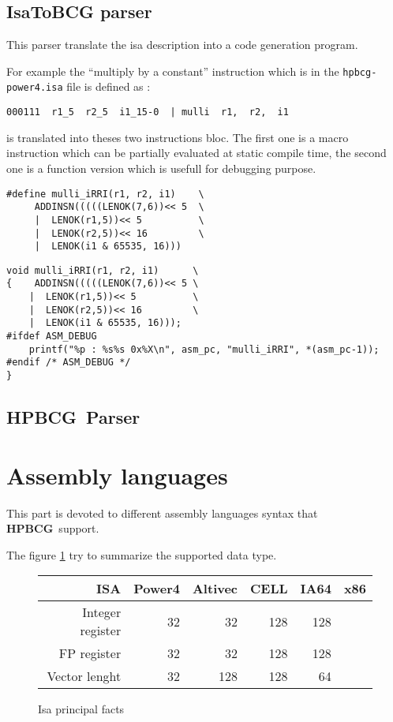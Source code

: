 \documentclass{article}
\newcommand{\hpbcg}{\textbf{HPBCG}\ }
\begin{document}
\subsection{IsaToBCG parser}

This parser translate the isa description into a code generation
program.

For example the ``multiply by a constant'' instruction which is in the
\texttt{hpbcg-power4.isa} file is defined as :

\begin{verbatim}
000111  r1_5  r2_5  i1_15-0  | mulli  r1,  r2,  i1
\end{verbatim}

is translated into theses two instructions bloc. The first one is a
macro instruction which can be partially evaluated at static compile
time, the second one is a function version which is usefull for
debugging purpose.

\begin{verbatim}
#define mulli_iRRI(r1, r2, i1)    \
     ADDINSN(((((LENOK(7,6))<< 5  \
     |  LENOK(r1,5))<< 5          \
     |  LENOK(r2,5))<< 16         \
     |  LENOK(i1 & 65535, 16)))
\end{verbatim}

\begin{verbatim}
void mulli_iRRI(r1, r2, i1)      \
{    ADDINSN(((((LENOK(7,6))<< 5 \
    |  LENOK(r1,5))<< 5          \
    |  LENOK(r2,5))<< 16         \
    |  LENOK(i1 & 65535, 16)));
#ifdef ASM_DEBUG
    printf("%p : %s%s 0x%X\n", asm_pc, "mulli_iRRI", *(asm_pc-1));
#endif /* ASM_DEBUG */
}
\end{verbatim}

\subsection{\hpbcg Parser}

\section{Assembly languages}

This part is devoted to different assembly languages syntax that
\hpbcg support.

The figure \ref{fig:ISACompare} try to summarize the supported data
type.

\begin{figure}
\begin{tabular}{|r|r|r|r|r|r|} \hline
  ISA 		   & Power4  & Altivec & CELL & IA64 & x86\\ \hline
  Integer register & 32      & 32      & 128  & 128  &  \\ 
  FP register      & 32      & 32      & 128  & 128  &  \\
  Vector lenght    & 32      & 128     & 128  & 64   &  \\\hline
\end{tabular}
  \caption{Isa principal facts}
  \label{fig:ISACompare}
\end{figure}
\end{document}
